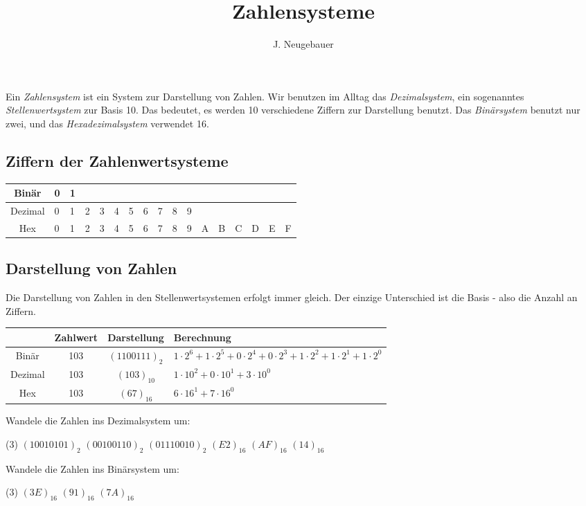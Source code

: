 \documentclass[10pt, a4paper]{scrartcl}
\author{J. Neugebauer}
\title{Zahlensysteme}
\date{\Heute}
\begin{document}
\ReiheTitel

Ein \emph{Zahlensystem} ist ein System zur Darstellung von Zahlen. Wir benutzen im Alltag das \emph{Dezimalsystem}, ein sogenanntes \emph{Stellenwertsystem} zur Basis 10. Das bedeutet, es werden 10 verschiedene Ziffern zur Darstellung benutzt. Das \emph{Binärsystem} benutzt nur zwei, und das \emph{Hexadezimalsystem} verwendet 16.

\subsection*{Ziffern der Zahlenwertsysteme}
\begin{tabularx}{\textwidth}{c|*{16}{|X}}
	Binär& 0& 1 &&&&&&&&&&&&&& \\ \hline
	Dezimal& 0& 1& 2& 3& 4& 5& 6& 7& 8& 9&&&&&& \\\hline
	Hex& 0& 1& 2& 3& 4& 5& 6& 7& 8& 9& A& B& C& D& E& F
\end{tabularx}

\subsection*{Darstellung von Zahlen}
Die Darstellung von Zahlen in den Stellenwertsystemen erfolgt immer gleich. Der einzige Unterschied ist die Basis - also die Anzahl an Ziffern.

\begin{tabularx}{\textwidth}{c|c|c|X}
	& Zahlwert & Darstellung & Berechnung \\ \hline
	Binär & \num{103} & $(1100111)_2$ & $1\cdot 2^6 + 1\cdot 2^5 + 0\cdot 2^4 + 0\cdot 2^3 + 1\cdot 2^2 + 1\cdot 2^1 + 1\cdot 2^0$ \\ \hline
	Dezimal & \num{103} & $(103)_{10}$ & $1\cdot 10^2 + 0\cdot 10^1 + 3\cdot 10^0$ \\ \hline
	Hex & \num{103} & $(67)_{16}$ & $6\cdot 16^1 + 7\cdot 16^0$
\end{tabularx}
\bigskip

\begin{aufgabe}
	Wandele die Zahlen ins Dezimalsystem um:
	\begin{tasks}(3)
		\task $(1001 0101)_2$ \task $(0010 0110)_2$ \task $(0111 0010)_2$
		\task $(E2)_{16}$ \task $(AF)_{16}$ \task $(14)_{16}$
	\end{tasks}
\end{aufgabe}

\begin{aufgabe}
	Wandele die Zahlen ins Binärsystem um:
	\begin{tasks}(3)
		\task $(3E)_{16}$ \task $(91)_{16}$ \task $(7A)_{16}$
	\end{tasks}
\end{aufgabe}
\end{document}
